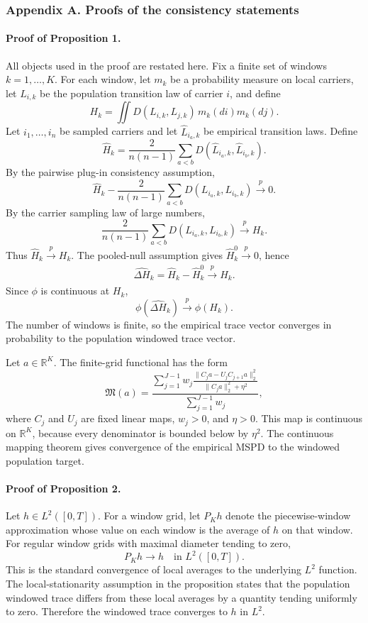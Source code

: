 \subsubsection*{Appendix A. Proofs of the consistency statements}
\label{method:appendix-proof}

\paragraph{Proof of Proposition 1.}
All objects used in the proof are restated here.  Fix a finite set of windows \(k=1,\ldots,K\).  For each window, let \(m_k\) be a probability measure on local carriers, let \(L_{i,k}\) be the population transition law of carrier \(i\), and define
\[
  H_k=
  \iint D(L_{i,k},L_{j,k})\,m_k(di)m_k(dj).
\]
Let \(i_1,\ldots,i_n\) be sampled carriers and let \(\widehat L_{i_a,k}\) be empirical transition laws.  Define
\[
  \widehat H_k=
  \frac{2}{n(n-1)}
  \sum_{a<b}D(\widehat L_{i_a,k},\widehat L_{i_b,k}).
\]
By the pairwise plug-in consistency assumption,
\[
  \widehat H_k
  -
  \frac{2}{n(n-1)}
  \sum_{a<b}D(L_{i_a,k},L_{i_b,k})
  \xrightarrow[]{p}0.
\]
By the carrier sampling law of large numbers,
\[
  \frac{2}{n(n-1)}
  \sum_{a<b}D(L_{i_a,k},L_{i_b,k})
  \xrightarrow[]{p}
  H_k.
\]
Thus \(\widehat H_k\xrightarrow[]{p}H_k\).  The pooled-null assumption gives \(\widehat H_k^0\xrightarrow[]{p}0\), hence
\[
  \widehat{\Delta H}_k=\widehat H_k-\widehat H_k^0
  \xrightarrow[]{p}H_k.
\]
Since \(\phi\) is continuous at \(H_k\),
\[
  \phi(\widehat{\Delta H}_k)
  \xrightarrow[]{p}
  \phi(H_k).
\]
The number of windows is finite, so the empirical trace vector converges in probability to the population windowed trace vector.

Let \(a\in\mathbb R^K\).  The finite-grid functional has the form
\[
  \mathfrak M(a)=
  \frac{
    \sum_{j=1}^{J-1}w_j
    \frac{\|C_j a-U_jC_{j+1}a\|_2^2}
         {\|C_ja\|_2^2+\eta^2}
  }{
    \sum_{j=1}^{J-1}w_j
  },
\]
where \(C_j\) and \(U_j\) are fixed linear maps, \(w_j>0\), and \(\eta>0\).  This map is continuous on \(\mathbb R^K\), because every denominator is bounded below by \(\eta^2\).  The continuous mapping theorem gives convergence of the empirical MSPD to the windowed population target.

\paragraph{Proof of Proposition 2.}
Let \(h\in L^2([0,T])\).  For a window grid, let \(P_Kh\) denote the piecewise-window approximation whose value on each window is the average of \(h\) on that window.  For regular window grids with maximal diameter tending to zero,
\[
  P_Kh\to h
  \quad\text{in }L^2([0,T]).
\]
This is the standard convergence of local averages to the underlying \(L^2\) function.  The local-stationarity assumption in the proposition states that the population windowed trace differs from these local averages by a quantity tending uniformly to zero.  Therefore the windowed trace converges to \(h\) in \(L^2\).

